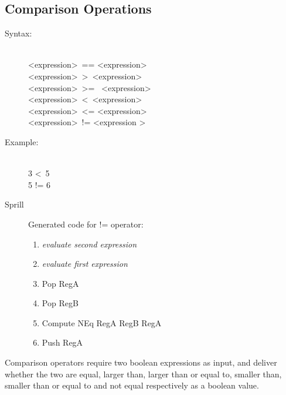 \documentclass[10pt,a4paper]{report}
\begin{document}
\subsection{Comparison Operations}
\begin{description}
	\item[Syntax:] \hfill \\ 
		\textless expression\textgreater ~== \textless expression\textgreater \\
		\textless expression\textgreater ~\textgreater ~\textless expression\textgreater \\
		\textless expression\textgreater ~\textgreater = ~\textless expression\textgreater \\
		\textless expression\textgreater ~\textless ~\textless expression\textgreater \\
		\textless expression\textgreater ~\textless = \textless expression\textgreater \\
		\textless expression\textgreater ~!= \textless expression \textgreater
	\item[Example:] \hfill \\
		3 \textless ~5 \\
		5 != 6
	\item[Sprill] Generated code for != operator:
		\begin{enumerate}
			\item \emph{evaluate second expression}
			\item \emph{evaluate first expression}
			\item Pop RegA
			\item Pop RegB
			\item Compute NEq RegA RegB RegA
			\item Push RegA
		\end{enumerate}
		
\end{description}
Comparison operators require two boolean expressions as input, and deliver whether the two are equal, larger than, larger than or equal to, smaller than, smaller than or equal to and not equal respectively as a boolean value.
\end{document}
